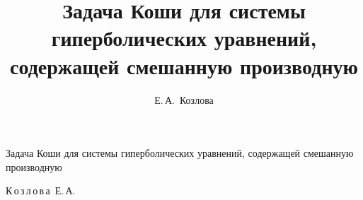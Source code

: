 %

%

%

%


%

%


%







\renewcommand{\firstpage}{218}

\renewcommand{\lastpage}{221}






\title{Задача Коши для системы гиперболических уравнений, содержащей смешанную производную}


{Задача Коши для системы гиперболических уравнений, содержащей смешанную производную}




\author{Е.\,А.~Козлова}%

{К\,о\,з\,л\,о\,в\,а~Е.\,А.}%








\otherinf

 {



 }






